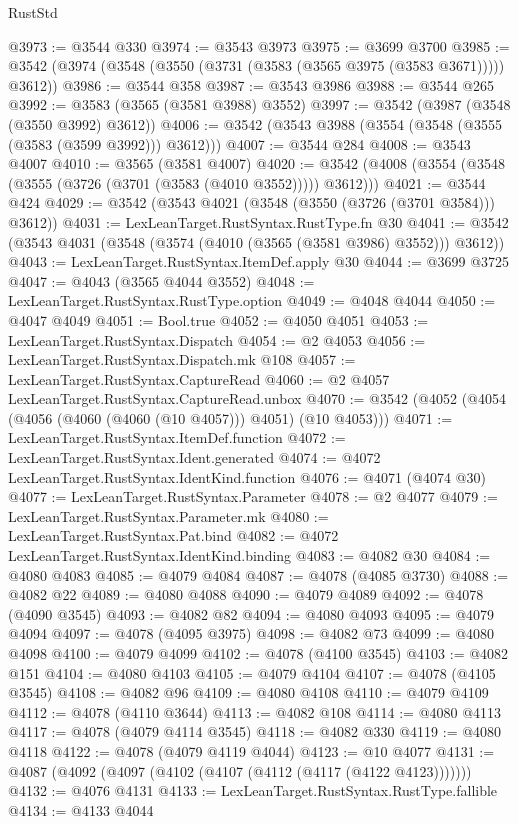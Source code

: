 \begin{lexlean}{RustStd}
\begin{coremodule}
@3973 := @3544 @330
@3974 := @3543 @3973
@3975 := @3699 @3700
@3985 := @3542 (@3974 (@3548 (@3550 (@3731 (@3583 (@3565 @3975 (@3583 @3671))))) @3612))
@3986 := @3544 @358
@3987 := @3543 @3986
@3988 := @3544 @265
@3992 := @3583 (@3565 (@3581 @3988) @3552)
@3997 := @3542 (@3987 (@3548 (@3550 @3992) @3612))
@4006 := @3542 (@3543 @3988 (@3554 (@3548 (@3555 (@3583 (@3599 @3992))) @3612)))
@4007 := @3544 @284
@4008 := @3543 @4007
@4010 := @3565 (@3581 @4007)
@4020 := @3542 (@4008 (@3554 (@3548 (@3555 (@3726 (@3701 (@3583 (@4010 @3552))))) @3612)))
@4021 := @3544 @424
@4029 := @3542 (@3543 @4021 (@3548 (@3550 (@3726 (@3701 @3584))) @3612))
@4031 := LexLeanTarget.RustSyntax.RustType.fn @30
@4041 := @3542 (@3543 @4031 (@3548 (@3574 (@4010 (@3565 (@3581 @3986) @3552))) @3612))
@4043 := LexLeanTarget.RustSyntax.ItemDef.apply @30
@4044 := @3699 @3725
@4047 := @4043 (@3565 @4044 @3552)
@4048 := LexLeanTarget.RustSyntax.RustType.option
@4049 := @4048 @4044
@4050 := @4047 @4049
@4051 := Bool.true
@4052 := @4050 @4051
@4053 := LexLeanTarget.RustSyntax.Dispatch
@4054 := @2 @4053
@4056 := LexLeanTarget.RustSyntax.Dispatch.mk @108
@4057 := LexLeanTarget.RustSyntax.CaptureRead
@4060 := @2 @4057 LexLeanTarget.RustSyntax.CaptureRead.unbox
@4070 := @3542 (@4052 (@4054 (@4056 (@4060 (@4060 (@10 @4057))) @4051) (@10 @4053)))
@4071 := LexLeanTarget.RustSyntax.ItemDef.function
@4072 := LexLeanTarget.RustSyntax.Ident.generated
@4074 := @4072 LexLeanTarget.RustSyntax.IdentKind.function
@4076 := @4071 (@4074 @30)
@4077 := LexLeanTarget.RustSyntax.Parameter
@4078 := @2 @4077
@4079 := LexLeanTarget.RustSyntax.Parameter.mk
@4080 := LexLeanTarget.RustSyntax.Pat.bind
@4082 := @4072 LexLeanTarget.RustSyntax.IdentKind.binding
@4083 := @4082 @30
@4084 := @4080 @4083
@4085 := @4079 @4084
@4087 := @4078 (@4085 @3730)
@4088 := @4082 @22
@4089 := @4080 @4088
@4090 := @4079 @4089
@4092 := @4078 (@4090 @3545)
@4093 := @4082 @82
@4094 := @4080 @4093
@4095 := @4079 @4094
@4097 := @4078 (@4095 @3975)
@4098 := @4082 @73
@4099 := @4080 @4098
@4100 := @4079 @4099
@4102 := @4078 (@4100 @3545)
@4103 := @4082 @151
@4104 := @4080 @4103
@4105 := @4079 @4104
@4107 := @4078 (@4105 @3545)
@4108 := @4082 @96
@4109 := @4080 @4108
@4110 := @4079 @4109
@4112 := @4078 (@4110 @3644)
@4113 := @4082 @108
@4114 := @4080 @4113
@4117 := @4078 (@4079 @4114 @3545)
@4118 := @4082 @330
@4119 := @4080 @4118
@4122 := @4078 (@4079 @4119 @4044)
@4123 := @10 @4077
@4131 := @4087 (@4092 (@4097 (@4102 (@4107 (@4112 (@4117 (@4122 @4123)))))))
@4132 := @4076 @4131
@4133 := LexLeanTarget.RustSyntax.RustType.fallible
@4134 := @4133 @4044

\end{coremodule}
\end{lexlean}
